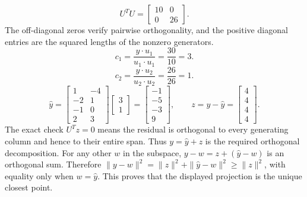 \[U^TU=\left[\begin{array}{rr}10&0\\0&26\end{array}\right].\]
The off-diagonal zeros verify pairwise orthogonality, and the positive diagonal entries are the squared lengths of the nonzero generators.
\[c_{1}=\frac{y\cdot u_{1}}{u_{1}\cdot u_{1}}=\frac{30}{10}=3.\]
\[c_{2}=\frac{y\cdot u_{2}}{u_{2}\cdot u_{2}}=\frac{26}{26}=1.\]
\[\widehat y=\left[\begin{array}{rr}1&-4\\-2&1\\-1&0\\2&3\end{array}\right]\left[\begin{array}{r}3\\1\end{array}\right]=\left[\begin{array}{r}-1\\-5\\-3\\9\end{array}\right],\qquad z=y-\widehat y=\left[\begin{array}{r}4\\4\\4\\4\end{array}\right].\]
The exact check $U^Tz=0$ means the residual is orthogonal to every generating column and hence to their entire span. Thus $y=\widehat y+z$ is the required orthogonal decomposition.
For any other $w$ in the subspace, $y-w=z+(\widehat y-w)$ is an orthogonal sum. Therefore $\|y-w\|^2=\|z\|^2+\|\widehat y-w\|^2\ge\|z\|^2$, with equality only when $w=\widehat y$. This proves that the displayed projection is the unique closest point.


